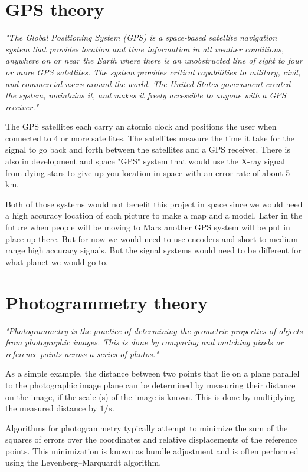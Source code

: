 \section{GPS theory}

\textit{"The Global Positioning System (GPS) is a space-based satellite navigation system that provides location and time information in all weather conditions, anywhere on or near the Earth where there is an unobstructed line of sight to four or more GPS satellites. The system provides critical capabilities to military, civil, and commercial users around the world. The United States government created the system, maintains it, and makes it freely accessible to anyone with a GPS receiver."\cite{GPS1}}

The GPS satellites each carry an atomic clock and positions the user when connected to 4 or more satellites. The satellites measure the time it take for the signal to go back and forth between the satellites and a GPS receiver.\cite{GPS1} There is also in development and space "GPS" system that would use the X-ray signal from dying stars to give up you location in space with an error rate of about 5 km.\cite{GPS2}

Both of those systems would not benefit this project in space since we would need a high accuracy location of each picture to make a map and a model. Later in the future when people will be moving to Mars another GPS system will be put in place up there. But for now we would need to use encoders and short to medium range high accuracy signals. But the signal systems would need to be different for what planet we would go to. 

\section{Photogrammetry theory}

\textit{"Photogrammetry is the practice of determining the geometric properties of objects from
photographic images. This is done by comparing and matching pixels or reference points across a series
of photos."\cite{Photogrammetry}}


As a simple example, the distance between two points that lie on a plane parallel to the photographic image plane can be determined by measuring their distance on the image, if the scale (s) of the image is known. This is done by multiplying the measured distance by $1/s$.\cite{photo}

Algorithms for photogrammetry typically attempt to minimize the sum of the squares of errors over the coordinates and relative displacements of the reference points. This minimization is known as bundle adjustment and is often performed using the Levenberg–Marquardt algorithm.\cite{photo}


